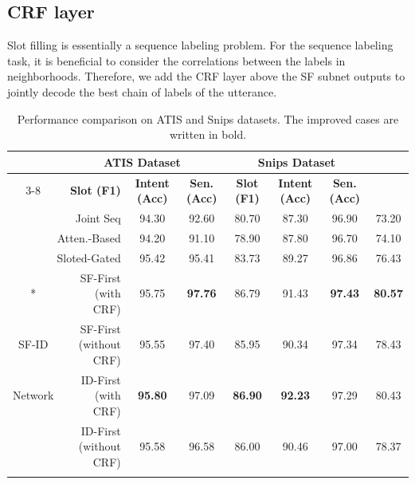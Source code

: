 \documentclass[11pt,a4paper]{article}
\begin{document}
\subsection{CRF layer}
Slot filling is essentially a sequence labeling problem. For the sequence labeling task, it is beneficial to consider the correlations between the labels in neighborhoods. Therefore, we add the CRF layer above the SF subnet outputs to jointly decode the best chain of labels of the utterance. 
\begin{table}[ht]
		\centering
		\small
		\begin{tabular}{c|r|ccc|ccc}
			\hlineB{2}
			\multicolumn{2}{c|}{ \multirow{2}*{\textbf{Model}}}& \multicolumn{3}{c|}{\textbf{ATIS Dataset}} &\multicolumn{3}{c}{\textbf{Snips Dataset}}\\
			\cline{3-8}
			\multicolumn{2}{c|}{}&\textbf{Slot (F1)}&\textbf{Intent (Acc)}&\textbf{Sen. (Acc)}&\textbf{Slot (F1)}&\textbf{Intent (Acc)}&\textbf{Sen. (Acc)}\\
			\hline
			\multicolumn{2}{r|}{Joint Seq \cite{hakkani2016multi}}&94.30&92.60&80.70&87.30&96.90&73.20\\
			\multicolumn{2}{r|}{Atten.-Based \cite{liu2016attention}}&94.20&91.10&78.90&87.80&96.70&74.10\\
			\multicolumn{2}{r|}{Sloted-Gated \cite{goo2018slot}}&95.42&95.41&83.73&89.27&96.86&76.43\\
			\hline
			\hline
			\multicolumn{1}{c|}{ \multirow{4}*{}}&SF-First (with CRF)&95.75&\textbf{97.76}&86.79&91.43&\textbf{97.43}&\textbf{80.57}\\
			\multicolumn{1}{c|}{SF-ID}&SF-First (without CRF)&95.55&97.40&85.95&90.34&97.34&78.43\\
			\multicolumn{1}{c|}{Network}&ID-First (with CRF)&\textbf{95.80}&97.09&\textbf{86.90}&\textbf{92.23}&97.29&80.43\\
			\multicolumn{1}{c|}{}&ID-First (without CRF)&95.58&96.58&86.00&90.46&97.00&78.37\\
			\hlineB{2}
		\end{tabular}
		\caption{\label{font-table}Performance comparison on ATIS and Snips datasets. The improved cases are written in bold.  }
	\end{table}
\end{document}
